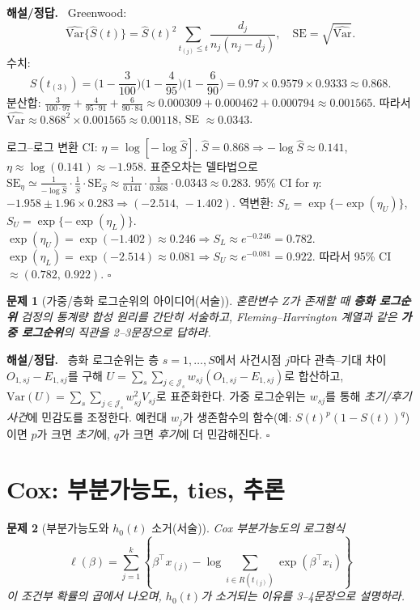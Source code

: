 \documentclass[12pt]{article}
\theoremstyle{myplain}
\newtheorem{problem}{문제}
\newenvironment{solution}{%
  \par\noindent\textbf{해설/정답.}\ }{\hfill$\square$\par}
\newcommand{\Var}{\mathrm{Var}}
\begin{document}
\begin{solution}
Greenwood:
\[
\widehat{\Var}\{\hat S(t)\}=\hat S(t)^2\sum_{t_{(j)}\le t}\frac{d_j}{n_j(n_j-d_j)},\quad
\mathrm{SE}=\sqrt{\widehat{\Var}}.
\]
수치:
\[
\hat S(t_{(3)})=\Big(1-\frac{3}{100}\Big)
\Big(1-\frac{4}{95}\Big)
\Big(1-\frac{6}{90}\Big)
=0.97\times 0.9579\times 0.9333\approx 0.868.
\]
분산합:
$\frac{3}{100\cdot 97}+\frac{4}{95\cdot 91}+\frac{6}{90\cdot 84}\approx 0.000309+0.000462+0.000794\approx 0.001565$.
따라서 $\widehat{\Var}\approx 0.868^2\times 0.001565\approx 0.00118$, SE $\approx 0.0343$.

로그--로그 변환 CI: $\eta=\log[-\log \hat S]$. $\hat S=0.868\Rightarrow -\log \hat S\approx 0.141$, $\eta\approx \log(0.141)\approx -1.958$.
표준오차는 델타법으로
$\mathrm{SE}_\eta\simeq \frac{1}{-\log \hat S}\cdot \frac{1}{\hat S}\cdot \mathrm{SE}_{\hat S}
\approx \frac{1}{0.141}\cdot \frac{1}{0.868}\cdot 0.0343\approx 0.283$.
95\% CI for $\eta$: $-1.958\pm 1.96\times 0.283\Rightarrow (-2.514,\,-1.402)$.
역변환: $S_L=\exp\{-\exp(\eta_U)\}$, $S_U=\exp\{-\exp(\eta_L)\}$.
$\exp(\eta_U)=\exp(-1.402)\approx 0.246\Rightarrow S_L\approx e^{-0.246}=0.782$.
$\exp(\eta_L)=\exp(-2.514)\approx 0.081\Rightarrow S_U\approx e^{-0.081}=0.922$.
따라서 95\% CI $\approx (0.782,\ 0.922)$.
\end{solution}

\begin{problem}[가중/층화 로그순위의 아이디어(서술)]
혼란변수 $Z$가 존재할 때 \textbf{층화 로그순위} 검정의 통계량 합성 원리를 간단히 서술하고,
Fleming--Harrington 계열과 같은 \textbf{가중 로그순위}의 직관을 2--3문장으로 답하라.
\end{problem}

\begin{solution}
층화 로그순위는 층 $s=1,\dots,S$에서 사건시점 $j$마다 관측--기대 차이 $O_{1,sj}-E_{1,sj}$를 구해
$U=\sum_s\sum_{j\in\mathcal{J}_s} w_{sj}(O_{1,sj}-E_{1,sj})$로 합산하고,
$\Var(U)=\sum_s\sum_{j\in\mathcal{J}_s} w_{sj}^2 V_{sj}$로 표준화한다.
가중 로그순위는 $w_{sj}$를 통해 \emph{초기/후기 사건}에 민감도를 조정한다.
예컨대 $w_j$가 생존함수의 함수(예: $S(t)^p(1-S(t))^q$)이면 $p$가 크면 \emph{초기}에, $q$가 크면 \emph{후기}에 더 민감해진다.
\end{solution}

\section{Cox: 부분가능도, ties, 추론}

\begin{problem}[부분가능도와 $h_0(t)$ 소거(서술)]
Cox 부분가능도의 로그형식
\[
\ell(\beta)=\sum_{j=1}^k\left\{\beta^\top x_{(j)}-\log\sum_{i\in R(t_{(j)})}\exp(\beta^\top x_i)\right\}
\]
이 \emph{조건부 확률의 곱}에서 나오며, $h_0(t)$가 소거되는 이유를 3--4문장으로 설명하라.
\end{problem}
\end{document}
